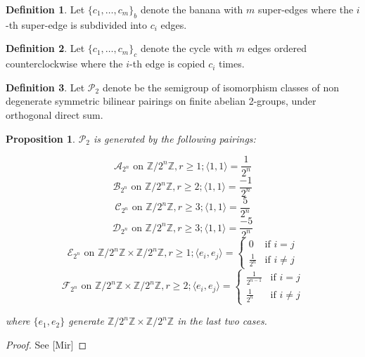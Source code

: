 \documentclass{amsart}
\newtheorem{prop}{Proposition}
\theoremstyle{definition}
\newtheorem{defn}{Definition}
\newcommand{\Z}{\ensuremath{\mathbb{Z}}}
\newcommand{\AP}{\ensuremath{\mathcal{A}_{2^{n}}}}
\newcommand{\BP}{\ensuremath{\mathcal{B}_{2^{n}}}}
\newcommand{\CP}{\ensuremath{\mathcal{C}_{2^{n}}}}
\newcommand{\DP}{\ensuremath{\mathcal{D}_{2^{n}}}}
\newcommand{\EP}{\ensuremath{\mathcal{E}_{2^{n}}}}
\newcommand{\FP}{\ensuremath{\mathcal{F}_{2^{n}}}}
\newcommand{\1}{\ensuremath{\mathds{1}}}
\begin{document}
 \begin{defn}
  Let $\{c_{1}, \dots, c_{m}\}_{b}$ denote the banana with $m$ super-edges where the $i$-th super-edge is subdivided into $c_{i}$ edges.
 \end{defn}
 
 \begin{defn}
  Let $\{c_{1}, \dots, c_{m}\}_{c}$ denote the cycle with $m$ edges ordered counterclockwise where the $i$-th edge is copied $c_{i}$ times.
 \end{defn}

 \begin{defn}
  Let $\mathcal{P}_{2}$ denote be the semigroup of isomorphism classes of non degenerate symmetric bilinear pairings on finite abelian 2-groups, under orthogonal direct sum.
 \end{defn}

 \begin{prop}
  $\mathcal{P}_{2}$ is generated by the following pairings:
  
   \[
  \AP \text{ on } \Z/2^{n}\Z, r\ge 1; \langle 1, 1\rangle=\frac{1}{2^{n}}
   \]
   \[
  \BP \text{ on } \Z/2^{n}\Z, r\ge 2; \langle 1, 1\rangle=\frac{-1}{2^{n}}
   \]
   \[
  \CP \text{ on } \Z/2^{n}\Z, r\ge 3; \langle 1, 1\rangle=\frac{5}{2^{n}}
   \]
   \[
  \DP \text{ on } \Z/2^{n}\Z, r\ge 3; \langle 1, 1\rangle=\frac{-5}{2^{n}}
   \]
   \[
  \EP \text{ on } \Z/2^{n}\Z\times\Z/2^{n}\Z, r\ge 1; \langle e_{i}, e_{j}\rangle=\begin{cases}0&\mbox{if } i=j\\ \frac{1}{2^{n}}&\mbox{if } i\neq j\end{cases}
   \]
   \[
  \FP \text{ on } \Z/2^{n}\Z\times\Z/2^{n}\Z, r\ge 2; \langle e_{i}, e_{j}\rangle=\begin{cases}\frac{1}{2^{n-1}}&\mbox{if } i=j\\ \frac{1}{2^{n}}&\mbox{if } i\neq j\end{cases}
   \]
   
where $\{e_{1}, e_{2}\}$ generate $\Z/2^{n}\Z\times\Z/2^{n}\Z$ in the last two cases.
 \end{prop}
 \begin{proof}
  See [Mir]
 \end{proof}
 
\end{document}
